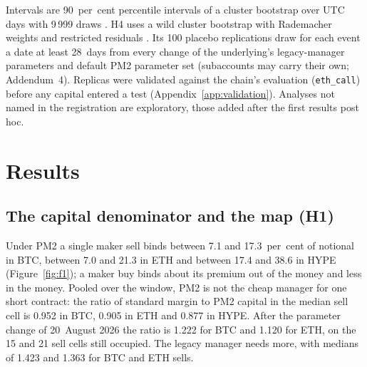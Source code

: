 \documentclass[a4paper,fleqn]{cas-dc}
\begin{document}
Intervals are 90~per~cent percentile intervals of a cluster bootstrap over UTC days with 9\,999 draws
\citep{cameron2008}. H4 uses a wild cluster bootstrap with Rademacher weights and restricted residuals
\citep{mackinnon2017,roodman2019}. Its 100 placebo replications draw for each event a date at least 28~days from every change of the
underlying's legacy-manager parameters and default PM2 parameter set (subaccounts may carry their own;
Addendum~4). Replicas were validated
against the chain's evaluation (\texttt{eth\_call}) before any capital entered a test
(Appendix~\ref{app:validation}). Analyses not named in the registration are exploratory, those added after the
first results post hoc.

\section{Results}\label{sec:results}

\subsection{The capital denominator and the map (H1)}
Under PM2 a single maker sell binds between 7.1 and 17.3~per~cent of notional in BTC, between 7.0 and 21.3 in
ETH and between 17.4 and 38.6 in HYPE (Figure~\ref{fig:f1}); a maker buy binds about its premium out of the
money and less in the money. Pooled over the window, PM2 is not the cheap manager for one short contract: the
ratio of standard margin to PM2 capital in the median sell cell is 0.952 in BTC, 0.905 in ETH and 0.877 in
HYPE. After the parameter change of 20~August 2026 the ratio is 1.222 for BTC and 1.120 for ETH, on the 15 and
21 sell cells still occupied. The legacy manager needs more, with medians of 1.423 and 1.363 for BTC and ETH
sells.
\end{document}
